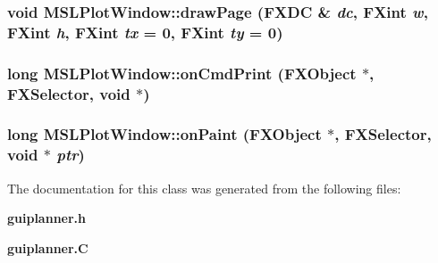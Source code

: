 \subsubsection{\setlength{\rightskip}{0pt plus 5cm}void MSLPlot\-Window::draw\-Page (FXDC \& {\em dc}, FXint {\em w}, FXint {\em h}, FXint {\em tx} = 0, FXint {\em ty} = 0)}\label{classMSLPlotWindow_a3}


\subsubsection{\setlength{\rightskip}{0pt plus 5cm}long MSLPlot\-Window::on\-Cmd\-Print (FXObject $\ast$, FXSelector, void $\ast$)}\label{classMSLPlotWindow_a1}


\subsubsection{\setlength{\rightskip}{0pt plus 5cm}long MSLPlot\-Window::on\-Paint (FXObject $\ast$, FXSelector, void $\ast$ {\em ptr})}\label{classMSLPlotWindow_a0}




The documentation for this class was generated from the following files:\begin{CompactItemize}
\item 
{\bf guiplanner.h}\item 
{\bf guiplanner.C}\end{CompactItemize}
